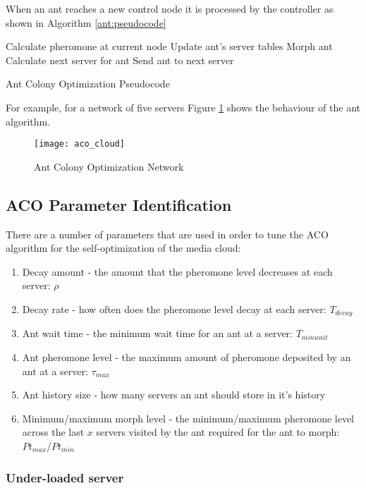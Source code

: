 When an ant reaches a new control node it is processed by the controller as shown in Algorithm \ref{ant:pseudocode}

\begin{algorithm}
\begin{algorithmic}
	\State Calculate pheromone at current node
	\State Update ant's server tables
		\State Morph ant
	\Else
		\State Calculate next server for ant
		\State Send ant to next server
	\EndIf
\end{algorithmic}
\caption{Ant Colony Optimization Pseudocode}\label{ant:pseudocode}
\end{algorithm}

For example, for a network of five servers Figure \ref{fig:antnetwork} shows the behaviour of the ant algorithm.

\begin{figure}
	\centering
	\texttt{[image: aco\_cloud]}
	\caption{Ant Colony Optimization Network}
	\label{fig:antnetwork}
\end{figure}

\subsection{ACO Parameter Identification}

There are a number of parameters that are used in order to tune the ACO algorithm for the self-optimization of the media cloud:

\begin{enumerate}
	\item Decay amount - the amount that the pheromone level decreases at each server: $\rho$
	\item Decay rate - how often does the pheromone level decay at each server: $T_{decay}$
	\item Ant wait time - the minimum wait time for an ant at a server: $T_{minwait}$
	\item Ant pheromone level - the maximum amount of pheromone deposited by an ant at a server: $\tau_{max}$
	\item Ant history size - how many servers an ant should store in it's history
	\item Minimum/maximum morph level - the minimum/maximum pheromone level across the last $x$ servers visited by the ant required for the ant to morph: $Pt_{max}$/$Pt_{min}$
\end{enumerate}

\subsubsection{Under-loaded server}

